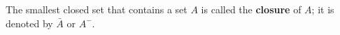 The smallest closed set that contains a set $A$ is called the \textbf{closure} of $A$; it is denoted by $\bar{A}$ or $A^{-}$.
